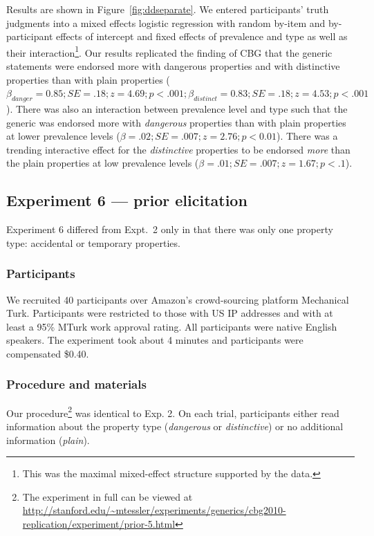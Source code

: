 \documentclass[10pt,letterpaper]{article}
\begin{document}
Results are shown in Figure~\ref{fig:ddseparate}. We entered participants' truth judgments into a mixed effects logistic regression with random by-item and by-participant effects of intercept and fixed effects of prevalence and type as well as their interaction\footnote{This was the maximal mixed-effect structure supported by the data.}.  
%
Our results replicated the finding of CBG that the generic statements were endorsed more with dangerous properties and with distinctive properties than with plain properties ($\beta_{danger}=0.85; SE = .18; z = 4.69; p < .001; \beta_{distinct}=0.83; SE = .18; z = 4.53; p < .001$). 
%
There was also an interaction between prevalence level and type such that the generic was endorsed more with \emph{dangerous} properties than with plain properties at lower prevalence levels ($\beta=.02; SE = .007; z=2.76; p < 0.01$). There was a trending interactive effect for the \emph{distinctive} properties to be endorsed \emph{more} than the plain properties at low prevalence levels ($\beta=.01; SE = .007; z=1.67; p < .1$).


\subsection{Experiment 6 --- prior elicitation}

Experiment 6 differed from Expt.~2 only in that there was only one property type: accidental or temporary properties. 

\subsubsection{Participants}

We recruited 40 participants over Amazon's crowd-sourcing platform Mechanical Turk. Participants were restricted to those with US IP addresses and with at least a 95\% MTurk work approval rating. All participants were native English speakers. The experiment took about 4 minutes and participants were compensated \$0.40.

\subsubsection{Procedure and materials}

Our procedure\footnote{The experiment in full can be viewed at \url{http://stanford.edu/~mtessler/experiments/generics/cbg2010-replication/experiment/prior-5.html}} was identical to Exp. 2. On each trial, participants either read information about the property type (\emph{dangerous} or \emph{distinctive}) or no additional information (\emph{plain}). 
\end{document}
